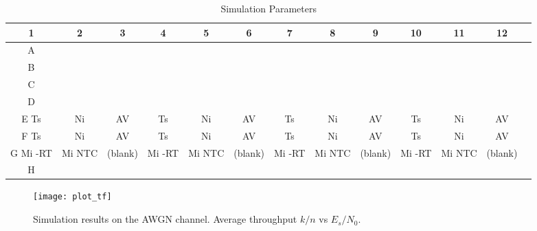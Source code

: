 \documentclass[journal, a4paper]{IEEEtran}
\begin{document}
    \begin{table}[!hbt]
        \begin{center}
        \caption{Simulation Parameters}
        \label{tab:simParameters}
        \begin{tabular}{|c|c|c|c|c|c|c|c|c|c|c|c|c|}
            \hline
            1 & 2 & 3 & 4 & 5 & 6 & 7 & 8 & 9 & 10 & 11 & 12 \\
            \hline
            A & & & & & & & & & & & \\
            \hline
            B & & & & & & & & & & & \\
            \hline
            C & & & & & & & & & & & \\
            \hline
            D & & & & & & & & & & & \\
            \hline
            E Ts & Ni & AV & Ts & Ni & AV & Ts & Ni & AV & Ts & Ni & AV\\
            \hline
            F Ts & Ni & AV & Ts & Ni & AV & Ts & Ni & AV & Ts & Ni & AV\\
            \hline
            G Mi -RT & Mi NTC & (blank) & Mi -RT & Mi NTC & (blank) & Mi -RT & Mi NTC & (blank) & Mi -RT & Mi NTC & (blank)\\
            \hline
            H & & & & & & & & & & & \\
            \hline


        \end{tabular}
        \end{center}
    \end{table}


    \begin{figure}[!hbt]
        \begin{center}
        \texttt{[image: plot\_tf]}
        \caption{Simulation results on the AWGN channel. Average throughput $k/n$ vs $E_s/N_0$.}
        \label{fig:tf_plot}
        \end{center}
    \end{figure}
\end{document}
